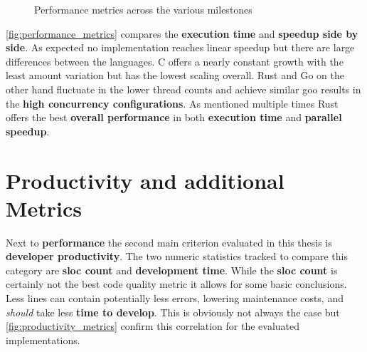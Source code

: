 \begin{figure}[htb]
{{
        }
    }
    \caption{Performance metrics across the various milestones}
    \label{fig:performance_metrics}
\end{figure}

\autoref{fig:performance_metrics} compares the \textbf{execution time} and \textbf{speedup side by side}. As expected no implementation reaches linear speedup but there are large differences between the languages. C offers a nearly constant growth with the least amount variation but has the lowest scaling overall. Rust and Go on the other hand fluctuate in the lower thread counts and achieve similar goo results in the \textbf{high concurrency configurations}. As mentioned multiple times Rust offers the best \textbf{overall performance} in both \textbf{execution time} and \textbf{parallel speedup}.

\section{Productivity and additional Metrics}
\label{sec:Evaluation::Metrics}

Next to \textbf{performance} the second main criterion evaluated in this thesis is \textbf{developer productivity}. The two numeric statistics tracked to compare this category are \textbf{\gls{sloc} count} and \textbf{development time}. While the \textbf{\gls{sloc} count} is certainly not the best code quality metric it allows for some basic conclusions. Less lines can contain potentially less errors, lowering maintenance costs, and \textit{should} take less \textbf{time to develop}. This is obviously not always the case but \autoref{fig:productivity_metrics} confirm this correlation for the evaluated implementations.

